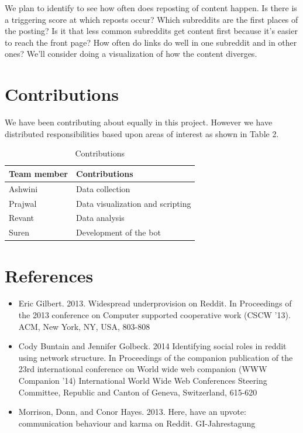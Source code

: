 \documentclass{article} %
\begin{document}
We plan to identify to see how often does reposting of content happen. Is there is a triggering score at which reposts occur? Which subreddits are the first places of the posting? Is it that less common subreddits get content first because it's easier to reach the front page? How often do links do well in one subreddit and in other ones? We'll consider doing a visualization of how the content diverges.
\fi


\section{Contributions}
We have been contributing about equally in this project. However we have distributed responsibilities based upon areas of interest as shown in Table 2.


\begin{table}
\begin{center}
    \begin{tabular}{ | l | l | }
    \hline
    Team member & Contributions \\ \hline
    Ashwini & Data collection \\ \hline
    Prajwal & Data visualization and scripting \\ \hline
    Revant & Data analysis \\ \hline
    Suren & Development of the bot \\ 
    \hline
    \end{tabular}
    \caption{Contributions}
    \end{center}
    \end{table}



\section{References}
\begin{itemize}
\item Eric Gilbert. 2013. Widespread underprovision on Reddit. In Proceedings of the 2013 conference on Computer supported cooperative work (CSCW '13). ACM, New York, NY, USA, 803-808
\item Cody Buntain and Jennifer Golbeck. 2014 Identifying social roles in reddit using network structure. In Proceedings of the companion publication of the 23rd international conference on World wide web companion (WWW Companion '14) International World Wide Web Conferences Steering Committee, Republic and Canton of Geneva, Switzerland, 615-620
\item Morrison, Donn, and Conor Hayes. 2013. Here, have an upvote: communication behaviour and karma on Reddit. GI-Jahrestagung
\end{itemize}
\end{document}
